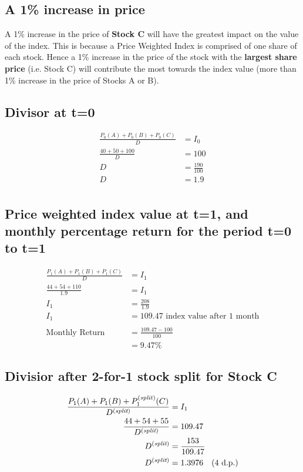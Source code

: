 \documentclass[12pt]{article}
\begin{document}
\subsection{A 1\% increase in price}
A 1\% increase in the price of \textbf{Stock C} will have the greatest impact on the value of the index. This is because a Price Weighted Index is comprised of one share of each stock. Hence a 1\% increase in the price of the stock with the \textbf{largest share price} (i.e. Stock C) will contribute the most towards the index value (more than 1\% increase in the price of Stocks A or B).

\subsection{Divisor at t=0}
\begin{align*}
	\frac{P_0(A) + P_0(B) + P_0(C)}{D} &= I_0\\
	\frac{40+50+100}{D} &= 100\\
	D &= \frac{190}{100} \\
	D &= 1.9\\
\end{align*}

\subsection{Price weighted index value at t=1, and monthly \newline percentage return for the period t=0 to t=1}
\begin{align*}
	\frac{P_1(A) + P_1(B) + P_1(C)}{D} &= I_1\\
	\frac{44+54+110}{1.9} &= I_1\\
	I_1 &= \frac{208}{1.9} \\
	I_1 &= 109.47 \text{ index value after 1 month}\\
	&\\
	\text{Monthly Return} &= \frac{109.47-100}{100}\\
	&= 9.47\%
\end{align*}

\subsection{Divisior after 2-for-1 stock split for Stock C}
\begin{align*}
	\frac{P_1(A) + P_1(B) + P_1^{\text{(\textit{split})}}(C)}{D^{(\textit{split})}} &= I_1\\
	\frac{44+54+55}{D^{(\textit{split})}} &= 109.47\\
	D^{(\textit{split})} &= \frac{153}{109.47} \\
	D^{(\textit{split})} &= 1.3976 \text{\quad(4 d.p.)}\\
\end{align*}
\end{document}
